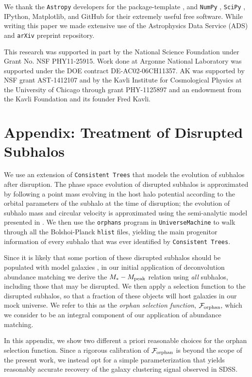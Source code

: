 \documentclass[usenatbib,usegraphicx,letterpaper]{mn2e}
\newcommand{\mstar}{M_{\ast}}
\newcommand{\mpeak}{M_{\rm peak}}
\begin{document}
We thank the {\tt Astropy} developers for the package-template \citep{astropy}, and {\tt NumPy} \citep{numpy_ndarray}, {\tt SciPy} \citep{scipy}, IPython, Matplotlib, and GitHub for their extremely useful free software. While writing this paper we made extensive use of the Astrophysics Data Service (ADS) and {\tt arXiv} preprint repository. 

This research was supported in part by the National Science Foundation under Grant No. NSF PHY11-25915. Work done at Argonne National Laboratory was supported under the DOE contract DE-AC02-06CH11357. AK was  supported by NSF grant  AST-1412107 and by the Kavli Institute for Cosmological Physics at the University of Chicago through grant PHY-1125897 and an endowment from the Kavli Foundation and its founder Fred Kavli.



\section*{Appendix: Treatment of Disrupted Subhalos}

We use an extension of {\tt Consistent Trees} that models the evolution of subhalos after disruption. The phase space evolution of disrupted subhalos is approximated by following a point mass evolving in the host halo potential according to the orbital parameters of the subhalo at the time of disruption; the evolution of subhalo mass and circular velocity is approximated using the semi-analytic model presented in \citet{jiang_vdB14}. We then use the {\tt orphans} program in {\tt UniverseMachine} to walk through all the Bolshoi-Planck {\tt hlist} files, yielding the main progenitor information of every subhalo that was ever identified by {\tt Consistent Trees}.

Since it is likely that some portion of these disrupted subhalos should be populated with model galaxies \citep{guo_white13, campbell_etal17}, in our initial application of deconvolution abundance matching we derive the $\mstar-\mpeak$ relation using {\em all} subhalos, including those that may be disrupted. We then apply a selection function to the disrupted subhalos, so that a fraction of these objects will host galaxies in our mock universe. We refer to this as the {\em orphan selection function}, $\mathcal{F}_{\rm orphan},$ which we consider to be an integral component of our application of abundance matching.

In this appendix, we show two different a priori reasonable choices for the orphan selection function. Since a rigorous calibration of $\mathcal{F}_{\rm orphan}$ is beyond the scope of the present work, we instead opt for a simple parameterization that yields reasonably accurate recovery of the galaxy clustering signal observed in SDSS. 
\end{document}
